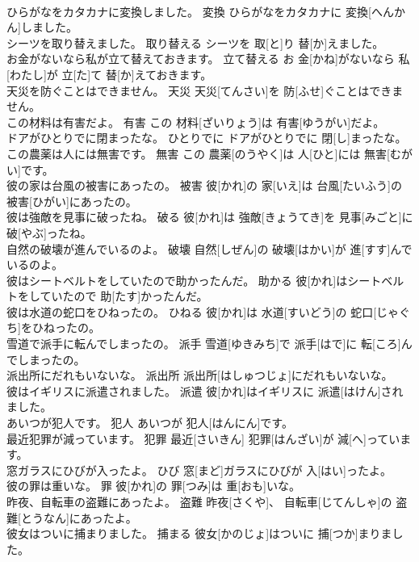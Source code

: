 \documentclass[8pt]{extreport}
\begin{document}
\begin{CJK}{UTF8}{min}
\\	ひらがなをカタカナに変換しました。	変換	ひらがなをカタカナに 変換[へんかん]しました。	
\\	シーツを取り替えました。	取り替える	シーツを 取[と]り 替[か]えました。	
\\	お金がないなら私が立て替えておきます。	立て替える	お 金[かね]がないなら 私[わたし]が 立[た]て 替[か]えておきます。	
\\	天災を防ぐことはできません。	天災	天災[てんさい]を 防[ふせ]ぐことはできません。	
\\	この材料は有害だよ。	有害	この 材料[ざいりょう]は 有害[ゆうがい]だよ。	
\\	ドアがひとりでに閉まったな。	ひとりでに	ドアがひとりでに 閉[し]まったな。	
\\	この農薬は人には無害です。	無害	この 農薬[のうやく]は 人[ひと]には 無害[むがい]です。	
\\	彼の家は台風の被害にあったの。	被害	彼[かれ]の 家[いえ]は 台風[たいふう]の 被害[ひがい]にあったの。	
\\	彼は強敵を見事に破ったね。	破る	彼[かれ]は 強敵[きょうてき]を 見事[みごと]に 破[やぶ]ったね。	
\\	自然の破壊が進んでいるのよ。	破壊	自然[しぜん]の 破壊[はかい]が 進[すす]んでいるのよ。	
\\	彼はシートベルトをしていたので助かったんだ。	助かる	彼[かれ]はシートベルトをしていたので 助[たす]かったんだ。	
\\	彼は水道の蛇口をひねったの。	ひねる	彼[かれ]は 水道[すいどう]の 蛇口[じゃぐち]をひねったの。	
\\	雪道で派手に転んでしまったの。	派手	雪道[ゆきみち]で 派手[はで]に 転[ころ]んでしまったの。	
\\	派出所にだれもいないな。	派出所	派出所[はしゅつじょ]にだれもいないな。	
\\	彼はイギリスに派遣されました。	派遣	彼[かれ]はイギリスに 派遣[はけん]されました。	
\\	あいつが犯人です。	犯人	あいつが 犯人[はんにん]です。	
\\	最近犯罪が減っています。	犯罪	最近[さいきん] 犯罪[はんざい]が 減[へ]っています。	
\\	窓ガラスにひびが入ったよ。	ひび	窓[まど]ガラスにひびが 入[はい]ったよ。	
\\	彼の罪は重いな。	罪	彼[かれ]の 罪[つみ]は 重[おも]いな。	
\\	昨夜、自転車の盗難にあったよ。	盗難	昨夜[さくや]、 自転車[じてんしゃ]の 盗難[とうなん]にあったよ。	
\\	彼女はついに捕まりました。	捕まる	彼女[かのじょ]はついに 捕[つか]まりました。	

\end{CJK}
\end{document}
